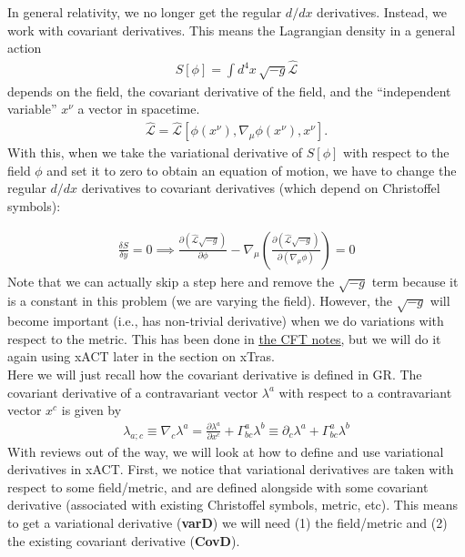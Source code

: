 \documentclass{book}
\theoremstyle{definition}
\newcommand{\p}{\partial}
\newcommand{\lag}{\mathcal{L}}
\newcommand{\f}[2]{\frac{#1}{#2}}
\newcommand{\lp}{\left(}
\newcommand{\rp}{\right)}
\begin{document}
In general relativity, we no longer get the regular $d/dx$ derivatives. Instead, we work with covariant derivatives. This means the Lagrangian density in a general action
\begin{align}
S[\phi] = \int d^4x\, \sqrt{-g}\hat{\lag}
\end{align}
depends on the field, the covariant derivative of the field, and the ``independent variable'' $x^\nu$ a vector in spacetime.
\begin{align}
\hat{\lag} = \hat{\lag}[\phi(x^\nu), \nabla_\mu \phi(x^\nu), x^\nu].
\end{align}
With this, when we take the variational derivative of $S[\phi]$ with respect to the
field $\phi$ and set it to zero to obtain an equation of motion, we have to change the
regular $d/dx$ derivatives to covariant derivatives (which depend on Christoffel
symbols):

\begin{align}
\f{\delta S}{\delta y} = 0 \implies \boxed{\f{\p (\hat{\lag}\sqrt{-g})}{\p \phi} - \nabla_\mu \lp \f{\p (\hat{\lag}\sqrt{-g})}{\p(\nabla_\mu \phi)} \rp = 0}
\end{align}
Note that we can actually skip a step here and remove the $\sqrt{-g}$ term because it is a constant in this problem (we are varying the field). However, the $\sqrt{-g}$ will become important (i.e., has non-trivial derivative) when we do variations with respect to the metric. This has been done in \href{https://huanqbui.com/LaTeX projects/Classical_Fields_Theory/HuanBui_ClassicalFieldTheory.pdf}{\underline{the CFT notes}}, but we will do it again using xACT later in the section on xTras.\\

Here we will just recall how the covariant derivative is defined in GR. The covariant derivative of a contravariant vector $\lambda^a$ with respect to a contravariant
vector $x^c$ is given by
\begin{align}
\boxed{\lambda_{a;c} \equiv \nabla_c \lambda^a = \f{\p \lambda^a}{\p x^c} + \Gamma^a_{bc}\lambda^b \equiv \p_c \lambda^a + \Gamma^a_{bc}\lambda^b}
\end{align}
With reviews out of the way, we will look at how to define and use variational derivatives in xACT. First, we notice that variational derivatives are
taken with respect to some field/metric, and are defined alongside with some
covariant derivative (associated with existing Christoffel symbols, metric, etc).
This means to get a variational derivative (\textbf{varD}) we will need (1) the field/metric
and (2) the existing covariant derivative (\textbf{CovD}).
\\
\end{document}
